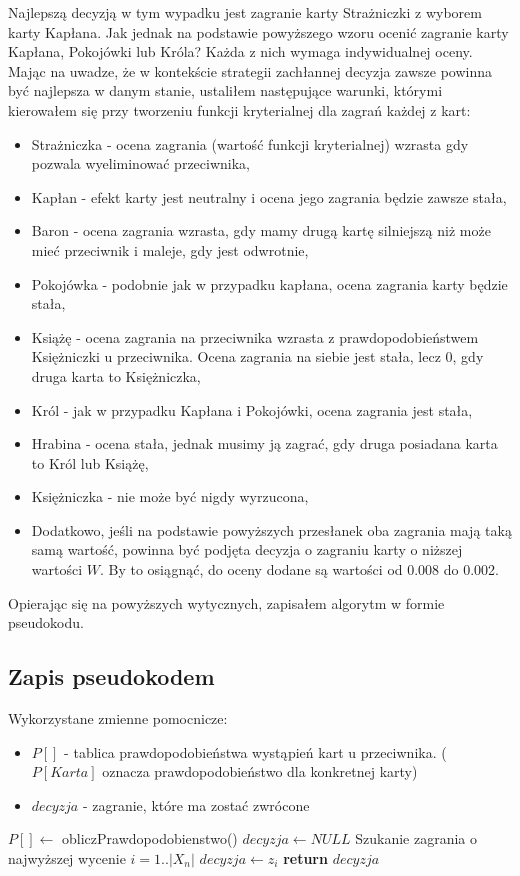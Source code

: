 Najlepszą decyzją w tym wypadku jest zagranie karty Strażniczki z wyborem karty Kapłana. Jak jednak na podstawie powyższego wzoru ocenić zagranie karty Kapłana, Pokojówki lub Króla? Każda z nich wymaga indywidualnej oceny. Mając na uwadze, że w kontekście strategii zachłannej decyzja zawsze powinna być najlepsza w danym stanie, ustaliłem następujące warunki, którymi kierowałem się przy tworzeniu funkcji kryterialnej dla zagrań każdej z kart:
\begin{itemize}
	\item Strażniczka - ocena zagrania (wartość funkcji kryterialnej) wzrasta gdy pozwala wyeliminować przeciwnika,
	\item Kapłan - efekt karty jest neutralny i ocena jego zagrania będzie zawsze stała,
	\item Baron - ocena zagrania wzrasta, gdy mamy drugą kartę silniejszą niż może mieć przeciwnik i maleje, gdy jest odwrotnie,
	\item Pokojówka - podobnie jak w przypadku kapłana, ocena zagrania karty będzie stała,
	\item Książę - ocena zagrania na przeciwnika wzrasta z prawdopodobieństwem Księżniczki u przeciwnika. Ocena zagrania na siebie jest stała, lecz 0, gdy druga karta to Księżniczka,
	\item Król - jak w przypadku Kapłana i Pokojówki, ocena zagrania jest stała,
	\item Hrabina - ocena stała, jednak musimy ją zagrać, gdy druga posiadana karta to Król lub Książę,
	\item Księżniczka - nie może być nigdy wyrzucona,
	\item Dodatkowo, jeśli na podstawie powyższych przesłanek oba zagrania mają taką samą wartość, powinna być podjęta decyzja o zagraniu karty o niższej wartości $W$. By to osiągnąć, do oceny dodane są wartości od 0.008 do 0.002.
\end{itemize}
Opierając się na powyższych wytycznych, zapisałem algorytm w formie pseudokodu.
\subsection{Zapis pseudokodem}
Wykorzystane zmienne pomocnicze:
\begin{itemize}
	\item $P[]$ - tablica prawdopodobieństwa wystąpień kart u przeciwnika. ($P[Karta]$ oznacza prawdopodobieństwo dla konkretnej karty)
	\item $decyzja$ - zagranie, które ma zostać zwrócone
\end{itemize}
\begin{algorithmic}[1]
		\State $P[] \gets$ obliczPrawdopodobienstwo()
		\State $ decyzja \gets NULL$ \Comment Szukanie zagrania o najwyższej wycenie
		 \Comment $i=1..|X_n|$
					\State $decyzja \gets z_i$
				\EndIf
		\EndFor		
		\State \textbf{return} $decyzja$
	\EndFunction
\end{algorithmic}

